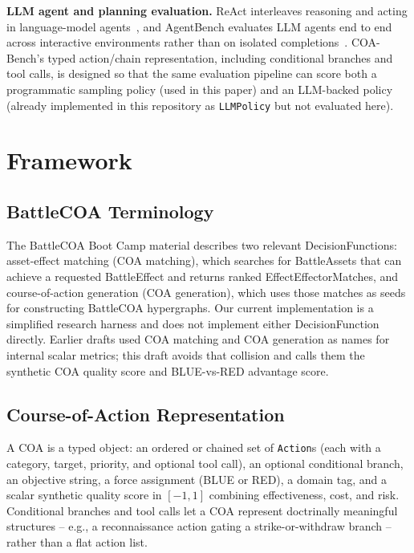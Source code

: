 \documentclass[sigconf]{acmart}
\begin{document}
\textbf{LLM agent and planning evaluation.} ReAct interleaves reasoning and acting in language-model agents~\cite{yao2023react}, and AgentBench evaluates LLM agents end to end across interactive environments rather than on isolated completions~\cite{liu2024agentbench}. COA-Bench's typed action/chain representation, including conditional branches and tool calls, is designed so that the same evaluation pipeline can score both a programmatic sampling policy (used in this paper) and an LLM-backed policy (already implemented in this repository as \texttt{LLMPolicy} but not evaluated here).

\section{Framework}

\subsection{BattleCOA Terminology}

The BattleCOA Boot Camp material describes two relevant DecisionFunctions: asset-effect matching (COA matching), which searches for BattleAssets that can achieve a requested BattleEffect and returns ranked EffectEffectorMatches, and course-of-action generation (COA generation), which uses those matches as seeds for constructing BattleCOA hypergraphs. Our current implementation is a simplified research harness and does not implement either DecisionFunction directly. Earlier drafts used COA matching and COA generation as names for internal scalar metrics; this draft avoids that collision and calls them the synthetic COA quality score and BLUE-vs-RED advantage score.

\subsection{Course-of-Action Representation}

A COA is a typed object: an ordered or chained set of \texttt{Action}s (each with a category, target, priority, and optional tool call), an optional conditional branch, an objective string, a force assignment (BLUE or RED), a domain tag, and a scalar synthetic quality score in $[-1, 1]$ combining effectiveness, cost, and risk. Conditional branches and tool calls let a COA represent doctrinally meaningful structures -- e.g., a reconnaissance action gating a strike-or-withdraw branch -- rather than a flat action list.
\end{document}
